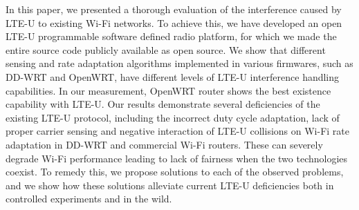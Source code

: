 
In this paper, we presented a thorough evaluation of the interference
caused by LTE-U to existing Wi-Fi networks. 
To achieve this, we have developed an  
open LTE-U programmable software defined radio platform, 
for which we made the entire source code publicly available as open source. 
We show that different sensing and rate adaptation algorithms implemented
in various firmwares, such as DD-WRT and OpenWRT, 
have different levels of LTE-U interference handling capabilities.
In our measurement, OpenWRT router shows the best 
existence capability with LTE-U. 
Our results demonstrate several deficiencies 
of the existing LTE-U protocol, including the incorrect duty cycle adaptation, 
lack of proper carrier sensing and negative interaction of LTE-U collisions on Wi-Fi rate adaptation in DD-WRT and commercial Wi-Fi routers.
These can severely degrade Wi-Fi performance leading to lack of fairness when the two technologies coexist. 
To remedy this, we propose solutions to each of the observed problems, and we show how these
solutions alleviate current LTE-U deficiencies both in controlled experiments and in the wild.



